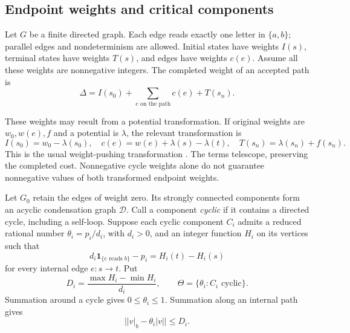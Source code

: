 \subsection{Endpoint weights and critical components}

Let $G$ be a finite directed graph. Each edge reads exactly one letter in
$\{a,b\}$; parallel edges and nondeterminism are allowed. Initial states
have weights $I(s)$, terminal states have weights $T(s)$, and edges have
weights $c(e)$. Assume all these weights are nonnegative integers.
The completed weight of an accepted path is
\begin{equation}
 \Delta=I(s_0)+\sum_{e\text{ on the path}}c(e)+T(s_n).
 \label{eq:abstract-cost}
\end{equation}

These weights may result from a potential transformation. If original
weights are $w_0,w(e),f$ and a potential is $\lambda$, the relevant transformation is
\begin{equation}
 I(s_0)=w_0-\lambda(s_0),\quad
 c(e)=w(e)+\lambda(s)-\lambda(t),\quad
 T(s_n)=\lambda(s_n)+f(s_n).
 \label{eq:weight-pushing}
\end{equation}
This is the usual weight-pushing transformation \cite[Section 6.3]{Mohri2009}. The terms telescope, preserving the completed cost. Nonnegative cycle
weights alone do not guarantee nonnegative values of both transformed
endpoint weights.

Let $G_0$ retain the edges of weight zero. Its strongly connected components
form an acyclic condensation graph $\mathcal D$. Call a component
\emph{cyclic} if it contains a directed cycle, including a self-loop.
Suppose each cyclic component $C_i$ admits a reduced rational number
$\theta_i=p_i/d_i$, with $d_i>0$, and an integer function $H_i$ on its vertices such that
\begin{equation}
 d_i\mathbf1_{\{e\text{ reads }b\}}-p_i=H_i(t)-H_i(s)
 \label{eq:count-potential}
\end{equation}
for every internal edge $e:s\longrightarrow t$. Put
\begin{equation}
 D_i=\frac{\max H_i-\min H_i}{d_i},\qquad
 \Theta=\{\theta_i:C_i\text{ cyclic}\}.
 \label{eq:critical-data}
\end{equation}
Summation around a cycle gives $0\leqslant\theta_i\leqslant1$.
Summation along an internal path gives
\begin{equation}
 \bigl||v|_b-\theta_i|v|\bigr|\leqslant D_i.
 \label{eq:internal-count-bound}
\end{equation}

